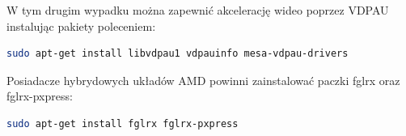 W tym drugim wypadku można zapewnić akcelerację wideo poprzez VDPAU instalując pakiety poleceniem:
\begin{lstlisting}[language=bash]
sudo apt-get install libvdpau1 vdpauinfo mesa-vdpau-drivers
\end{lstlisting}

Posiadacze hybrydowych układów AMD powinni zainstalować paczki fglrx oraz fglrx-pxpress:

\begin{lstlisting}[language=bash]
sudo apt-get install fglrx fglrx-pxpress
\end{lstlisting}
